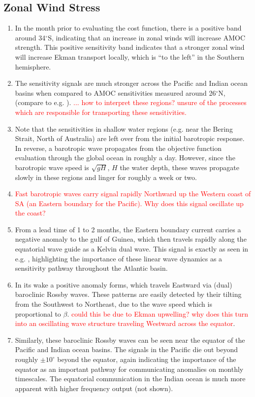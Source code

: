 \documentclass[a4paper,11pt]{article}
\newcommand{\red}[1]{\textcolor{red}{#1}}
\begin{document}
   \subsection{Zonal Wind Stress}
    \begin{enumerate}
	\item In the month prior to evaluating the cost function, there is a positive band around 34$^{\circ}$S, indicating that an increase in zonal winds will increase AMOC strength. This positive sensitivity band indicates that a stronger zonal wind will increase Ekman transport locally, which is ``to the left'' in the Southern hemisphere. 
	\item The sensitivity signals are much stronger across the Pacific and Indian ocean basins when compared to AMOC sensitivities measured around 26$^{\circ}$N, (compare to e.g. \cite{pillar} \cite{heimbach_timescales}). \red{... how to interpret these regions? unsure of the processes which are responsible for transporting these sensitivities.}
	\item Note that the sensitivities in shallow water regions (e.g. near the Bering Strait, North of Australia) are left over from the initial barotropic response. In reverse, a barotropic wave propagates from the objective function evaluation through the global ocean in roughly a day. However, since the barotropic wave speed is $\sqrt{gH}$, $H$ the water depth, these waves propagate slowly in these regions and linger for roughly a week or two. 
	\item \red{Fast barotropic waves carry signal rapidly Northward up the Western coast of SA (an Eastern boundary for the Pacific). Why does this signal oscillate up the coast?} 
	\item From a lead time of 1 to 2 months, the Eastern boundary current carries a negative anomaly to the gulf of Guinea, which then travels rapidly along the equatorial wave guide as a Kelvin dual wave. This signal is exactly as seen in e.g. \cite{pillar}, highlighting the importance of these linear wave dynamics as a sensitivity pathway throughout the Atlantic basin.
	\item In its wake a positive anomaly forms, which travels Eastward via (dual) baroclinic Rossby waves. These patterns are easily detected by their tilting from the Southwest to Northeast, due to the wave speed which is proportional to $\beta$. \red{could this be due to Ekman upwelling? why does this turn into an oscillating wave structure traveling Westward across the equator}.
	\item Similarly, these baroclinic Rossby waves can be seen near the equator of the Pacific and Indian ocean basins. The signals in the Pacific die out beyond roughly $\pm10^{\circ}$ beyond the equator, again indicating the importance of the equator as an important pathway for communicating anomalies on monthly timescales. The equatorial communication in the Indian ocean is much more apparent with higher frequency output (not shown).

\end{enumerate}
\end{document}
